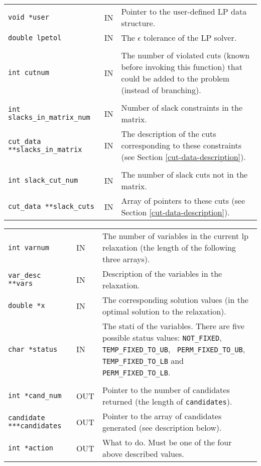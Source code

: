 \documentclass[twoside,11pt]{article}
\begin{document}
{\newpage
\clearpage
\samepage \begin{tabular}%
{llp{237.805pt}}
{\tt void *user} &  IN & Pointer to the user-defined LP data structure. \\ 
{\tt double lpetol} & IN & The $\epsilon$ tolerance of the LP solver. \\ 
& & \\ 
{\tt int cutnum} & IN & The number of violated cuts (known before invoking
this function) that could be added to the problem (instead of branching).\\ 
& & \\ 
{\tt int slacks\_in\_matrix\_num} & IN & Number of slack constraints in the
matrix. \\ 
{\tt cut\_data **slacks\_in\_matrix} & IN & The description of the cuts
corresponding to these constraints (see Section \ref{cut-data-description}). \\ 
& & \\ 
{\tt int slack\_cut\_num} & IN & The number of slack cuts not in the
matrix. \\ 
{\tt cut\_data **slack\_cuts} & IN & Array of pointers to these cuts
(see Section \ref{cut-data-description}).\\ 
\end{tabular}
}

{\newpage
\clearpage
\samepage \begin{tabular}{llp{260.256pt}}
{\tt int varnum} & IN & The number of variables in the current lp
relaxation (the length of the following three arrays).\\ 
{\tt var\_desc **vars} & IN & Description of the variables in the
relaxation. \\ 
{\tt double *x} & IN & The corresponding solution values (in the optimal
solution to the relaxation).\\ 
{\tt char *status} & IN & The stati of the variables. 
There are five possible status values: 
{\tt NOT\_\-FIXED}, {\tt TEMP\_\-FIXED\_\-TO\_\-UB}, {\tt
PERM\_\-FIXED\_\-TO\_\-UB}, {\tt TEMP\_\-FIXED\_\-TO\_\-LB} and {\tt
PERM\_\-FIXED\_\-TO\_\-LB}.\\  
& & \\ 
{\tt int *cand\_num} & OUT & Pointer to the number of candidates
returned (the length of {\tt *candidates}).\\ 
{\tt candidate ***candidates} & OUT & Pointer to the array of
candidates generated (see description below).\\ 
{\tt int *action} & OUT & What to do. Must be one of the four above described
values.
\end{tabular}
}
\end{document}

